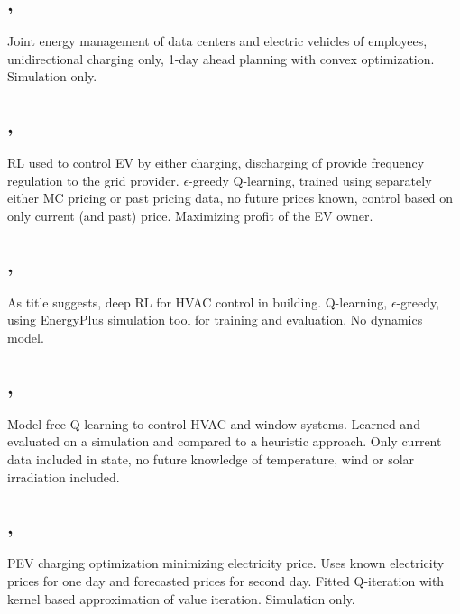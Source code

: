 \documentclass[a4paper]{article}
\begin{document}
\begin{multicols}{2}
	\subsection{, \cite{7552560}}
	
	Joint energy management of data centers and electric vehicles
	of employees, unidirectional charging only, 1-day ahead
	planning with convex optimization. Simulation only.
	
	\subsection{, \cite{6102330}}
	
	RL used to control EV by either charging, discharging of provide frequency regulation
	to the grid provider. $\epsilon$-greedy Q-learning, trained using separately either MC pricing 
	or past pricing data, no future prices known, control based on only current (and past) price.
	Maximizing profit of the EV owner. 
	
	\subsection{, \cite{8060306}}
	
	As title suggests, deep RL for HVAC control in building.
	Q-learning, $\epsilon$-greedy, using EnergyPlus simulation tool for training 
	and evaluation. No dynamics model.
	
	\subsection{, \cite{CHEN2018195}}
	
	Model-free Q-learning to control HVAC and window systems.
	Learned and evaluated on a simulation and compared to 
	a heuristic approach. Only current data included in state, 
	no future knowledge of temperature, wind or solar irradiation
	included.
	
	\subsection{, \cite{7178338}}
	
	PEV charging optimization minimizing electricity price. 
	Uses known electricity prices for one day and forecasted
	prices for second day. Fitted Q-iteration with kernel based
	approximation of value iteration. Simulation only. 
	

\end{multicols}
\end{document}
